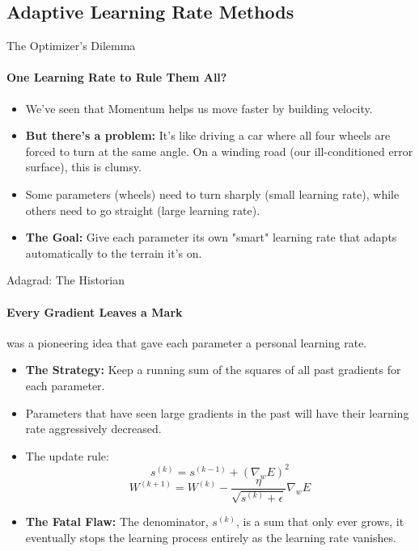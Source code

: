 \subsection{Adaptive Learning Rate Methods}

\begin{frame}{The Optimizer's Dilemma}
    \framesubtitle{One Learning Rate to Rule Them All?}
    \begin{itemize}
        \item We've seen that Momentum helps us move faster by building velocity.
        \item \textbf{But there's a problem:} It's like driving a car where all four wheels are forced to turn at the same angle. On a winding road (our ill-conditioned error surface), this is clumsy.
        \item Some parameters (wheels) need to turn sharply (small learning rate), while others need to go straight (large learning rate).
        \item \textbf{The Goal:} Give each parameter its own "smart" learning rate that adapts automatically to the terrain it's on.
    \end{itemize}
\end{frame}

\begin{frame}{Adagrad: The Historian}
    \framesubtitle{Every Gradient Leaves a Mark}
     was a pioneering idea that gave each parameter a personal learning rate.
    \begin{itemize}
        \item \textbf{The Strategy:} Keep a running sum of the squares of all past gradients for each parameter.
        \item Parameters that have seen large gradients in the past will have their learning rate aggressively decreased.
        \item The update rule:
            $$ s^{(k)} = s^{(k-1)} + (\nabla_w E)^2 $$
            $$ W^{(k+1)} = W^{(k)} - \frac{\eta}{\sqrt{s^{(k)} + \epsilon}} \nabla_w E $$
        \item \textbf{The Fatal Flaw:} The denominator, $s^{(k)}$, is a sum that only ever grows, it eventually stops the learning process entirely as the learning rate vanishes.
    \end{itemize}
\end{frame}

